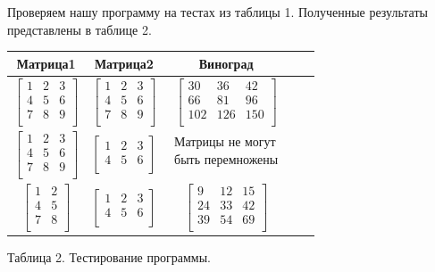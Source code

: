 \documentclass[a4paper,14pt]{article} %
\begin{document}
	\hfill
	Проверяем нашу программу на тестах из таблицы 1. Полученные результаты представлены в таблице 2. 
	\begin{center}
		\begin{tabular}{ | c | c | c | c | c |}
			\hline
			\textbf{Матрица1} & \textbf{Матрица2} & \textbf{Виноград} \\ \hline
			$\begin{bmatrix} 
   			1&2&3 \\
    			4&5&6 \\ 
   			7&8&9 \\ 
			\end{bmatrix}$ & 
			$\begin{bmatrix} 
   			1&2&3 \\
    			4&5&6 \\ 
   			7&8&9 \\ 
			\end{bmatrix}$ &
			$\begin{bmatrix} 
   			30&36&42 \\
    			66&81&96 \\ 
   			102&126&150 \\ 
			\end{bmatrix} $ \\ \hline
			
			$\begin{bmatrix} 
   			1&2&3 \\
    			4&5&6 \\ 
   			7&8&9 \\ 
			\end{bmatrix}$ & 
			$\begin{bmatrix} 
   			1&2&3 \\
    			4&5&6 \\ 
			\end{bmatrix}$ &
			$\begin{matrix} 
   			\text{Матрицы не могут} \\
    			\text{быть перемножены}\\ 
			\end{matrix} $ \\ \hline
			
			$\begin{bmatrix} 
   			1&2 \\
    			4&5 \\ 
   			7&8 \\ 
			\end{bmatrix}$ & 
			$\begin{bmatrix} 
   			1&2&3 \\
    			4&5&6 \\ 
			\end{bmatrix}$ &
			$\begin{bmatrix} 
   			9&12&15 \\
    			24&33&42 \\ 
   			39&54&69 \\ 
			\end{bmatrix} $ \\ \hline
		\end{tabular}
		
		\hfill
		
		Таблица 2.
		Тестирование программы.  
	\end{center}
	
\end{document}
